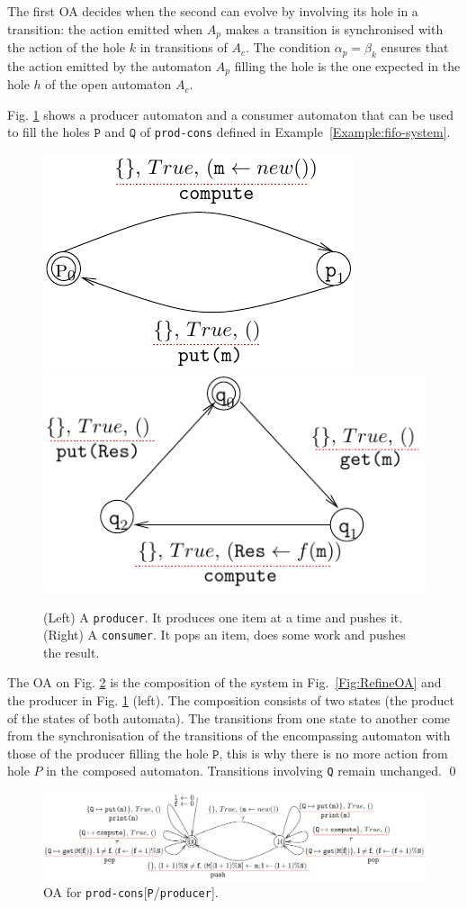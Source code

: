 \documentclass[runningheads]{llncs}
\begin{document}
The first OA decides when the second can evolve by involving its hole in a transition: the action emitted when \(A_p\) makes a transition is synchronised with the action of the hole \(k\) in transitions of \(A_c\).
The condition $ \alpha_p = \beta_k$ ensures that the action emitted by the automaton $A_p$ filling the hole is the one expected in the hole $h$ of the open automaton $A_c$.


\begin{example} \label{Example:prodandcons} Fig. \ref{Fig:procandcons} shows a producer automaton  and a consumer  automaton that can be used  to fill the holes $\texttt{P}$ and $\texttt{Q}$ of \texttt{prod-cons} defined in Example~\ref{Example:fifo-system}.
 \begin{figure}[!t]
 \centering
   \includegraphics[width=.35\textwidth]{Figures/P-proc.pdf}\hfill 
   \includegraphics[width=.45\textwidth]{Figures/Q-proc.pdf}
   \caption{(Left) A \texttt{producer}.  It produces one item at a time and pushes it.  (Right)  A \texttt{consumer}. It pops an item, does some work and pushes the result. \label{Fig:procandcons}}
\end{figure}



The OA on Fig. \ref{Fig:ComposeOA} is the composition of the system in Fig.~\ref{Fig:RefineOA} and the producer in Fig. \ref{Fig:procandcons} (left). The composition consists of two states (the product of the states of both automata). The transitions from one state to another come from  the synchronisation  of the transitions of the encompassing automaton with those of the producer filling the hole $\texttt{P}$, this is why there is no more action from hole $P$ in the composed automaton. Transitions involving \texttt{Q} remain unchanged. \qed


\begin{figure}[!t]
 \centering
   \includegraphics[width=.99\textwidth]{Figures/compos-FIFO-Pro.pdf}
   \caption{OA for \texttt{prod-cons}[\texttt{P}/\texttt{producer}]. 
   \label{Fig:ComposeOA}} 
\end{figure}
\end{example}
\end{document}
